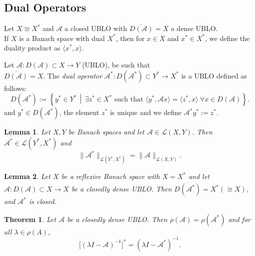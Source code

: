 \documentclass[12pt, oneside]{book}
\newtheorem{lemma}{Lemma}[section]
\newtheorem{theo}{Theorem}[section]
\newcommand{\A}{\mathscr{A}}
\begin{document}
\subsection{Dual Operators}	
Let $X\cong X^*$ and $\mathscr{A}$ a closed UBLO with $\overline{D(\mathscr{A})}=X$ a dense UBLO.\\
If $X$ is a Banach space with dual $X^*$, then for $x\in X$ and $x^*\in X^*$, we define the duality product as $\langle x^*,x\rangle$.
\begin{definition}
Let
$
\A : D(\A) \subset X \to Y
$ (UBLO), be such that \\ $\overline{D(\A)}=X$.
The \emph{dual operator}
$
\A^* : D(\A^*) \subset Y^* \to X^*
$ is a UBLO
 defined as follows:
 \vspace{-3mm}
\[
D(\A^*) :=
\left\{ y^* \in Y^* \,\middle|\, 
\exists z^* \in X^* \text{ such that }
\langle y^*, \A x \rangle = \langle z^*, x \rangle
\ \forall x \in D(\A)
\right\}.
\]
and $y^* \in D(\A^*)$, the element $z^*$ is unique and we define
$
\A^* y^* := z^*.
$	
\end{definition}		
\begin{lemma}
	Let $X, Y$ be Banach spaces and let $\mathscr{A} \in \mathcal{L}(X,Y)$.
	Then $\mathscr{A}^* \in \mathcal{L}(Y^*, X^*)$ and
	\vspace{-2mm}
	\[
	\|\mathscr{A}^*\|_{\mathcal{L}(Y^*,X^*)} = \|\mathscr{A}\|_{\mathcal{L}(X,Y)}.
	\]
\end{lemma}		
\begin{lemma}
	Let $X$ be a reflexive Banach space with $X=X^*$ and let
	$
	\mathscr{A} : D(\mathscr{A}) \subset X \to X
	$
	be a closedly dense UBLO.
	Then
	$
	\overline{D(\mathscr{A}^*)} = X^*
	(\cong X)$,
	and $\mathscr{A}^*$ is closed.
\end{lemma}		
\begin{theo}
	Let $\mathscr{A}$ be a closedly dense UBLO.
	Then
	$
	\rho(\mathscr{A}) = \rho(\mathscr{A}^*)
	$
	and for all $\lambda \in \rho(A)$,
	\vspace{-2mm}
	\[
	\bigl[(\lambda I - \mathscr{A})^{-1}\bigr]^*
	= ({\lambda} I - \mathscr{A}^*)^{-1}.
	\]
\end{theo}
\end{document}
